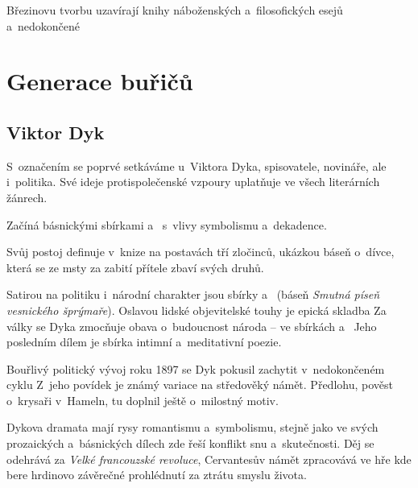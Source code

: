 Březinovu tvorbu uzavírají knihy náboženských a~filosofických esejů
 a~nedokončené 

\section{Generace buřičů}
\subsection*{Viktor Dyk}
S~označením  se poprvé setkáváme u~Viktora Dyka, spisovatele,
novináře, ale i~politika. Své ideje protispolečenské vzpoury uplatňuje
ve všech literárních žánrech.

Začíná básnickými sbírkami  
a~ s~vlivy symbolismu a~dekadence.

Svůj postoj definuje v~knize  na postavách tří
zločinců, ukázkou báseň  o~dívce, která se
ze msty za zabití přítele zbaví svých druhů.

Satirou na politiku i~národní charakter jsou sbírky  a~ (báseň \emph{Smutná píseň
vesnického šprýmaře}). Oslavou lidské objevitelské touhy je epická
skladba  Za války se Dyka zmocňuje obava
o~budoucnost národa -- ve sbírkách  a~ Jeho
posledním dílem je  sbírka intimní a~meditativní poezie.

Bouřlivý politický vývoj roku 1897 se Dyk pokusil zachytit
v~nedokončeném cyklu  Z~jeho
povídek je známý  variace na středověký námět. Předlohu,
pověst o~krysaři v~Hameln, tu doplnil ještě o~milostný motiv.

Dykova dramata mají rysy romantismu a~symbolismu, stejně jako ve svých
prozaických a~básnických dílech zde řeší konflikt snu a~skutečnosti. Děj
 se odehrává za \emph{Velké francouzské revoluce},
Cervantesův námět zpracovává ve hře  kde
bere hrdinovo závěrečné prohlédnutí za ztrátu smyslu života.


